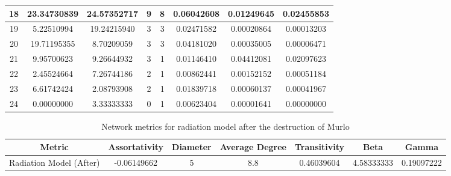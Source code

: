 \documentclass[12pt,a4paper]{thesis}
\begin{document}
\begin{table}[H]
\begin{tabular}{|c|c|c|c|c|c|c|c|}
\hline	18	&	23.34730839	&	24.57352717	&	9	&	8	&	0.06042608	&	0.01249645	&	0.02455853	\\
\hline	19	&	5.22510994	&	19.24215940	&	3	&	3	&	0.02471582	&	0.00020864	&	0.00013203	\\
\hline	20	&	19.71195355	&	8.70209059	&	3	&	3	&	0.04181020	&	0.00035005	&	0.00006471	\\
\hline	21	&	9.95700623	&	9.26644932	&	3	&	1	&	0.01146410	&	0.04412081	&	0.02097623	\\
\hline	22	&	2.45524664	&	7.26744186	&	2	&	1	&	0.00862441	&	0.00152152	&	0.00051184	\\
\hline	23	&	6.61742424	&	2.08793908	&	2	&	1	&	0.01839718	&	0.00060137	&	0.00041967	\\
\hline	24	&	0.00000000	&	3.33333333	&	0	&	1	&	0.00623404	&	0.00001641	&	0.00000000	\\
\hline 
\end{tabular} 
\label{tab:radNodeBefore}
\end{table}



\begin{table}[H]
\centering
\caption{Network metrics for radiation model after the destruction of Murlo}
\tiny
\begin{tabular}{|c|c|c|c|c|c|c|}
\hline Metric & Assortativity & Diameter & Average Degree & Transitivity & Beta & Gamma \\ 
\hline Radiation Model (After) & -0.06149662 & 5 & 8.8 & 0.46039604 & 4.58333333 & 0.19097222 \\ 
\hline 
\end{tabular} 
\label{tab:radNetAfter}
\end{table}
\end{document}
